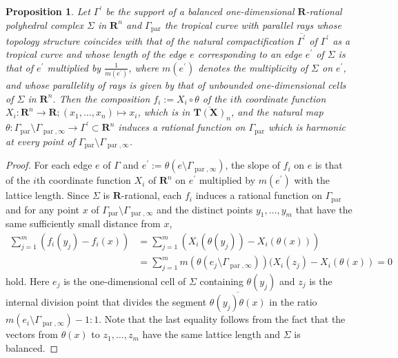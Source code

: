 \documentclass[a4paper,12pt]{amsart}
\newtheorem{prop}[dfn]{Proposition}
\def\Gamma{\varGamma}
\begin{document}
\begin{prop}
    \label{prop4-8-5}
Let $\Gamma^{\prime}$ be the support of a balanced one-dimensional $\boldsymbol{R}$-rational polyhedral complex $\Sigma$ in $\boldsymbol{R}^n$ and $\Gamma_{\operatorname{par}}$ the tropical curve with parallel rays whose topology structure coincides with that of the natural compactification $\overline{\Gamma^{\prime}}$ of $\Gamma^{\prime}$ as a tropical curve and whose length of the edge $e$ corresponding to an edge $e^{\prime}$ of $\Sigma$ is that of $e^{\prime}$ multiplied by $\frac{1}{m(e^{\prime})}$, where $m(e^{\prime})$ denotes the multiplicity of $\Sigma$ on $e^{\prime}$, and whose parallelity of rays is given by that of unbounded one-dimensional cells of $\Sigma$ in $\boldsymbol{R}^n$.
Then the composition $f_i := X_i \circ \theta$ of the $i$th coordinate function $X_i : \boldsymbol{R}^n \to \boldsymbol{R}; (x_1, \ldots, x_n) \mapsto x_i$, which is in $\overline{\boldsymbol{T}(\boldsymbol{X})}_n$, and the natural map $\theta : \Gamma_{\operatorname{par}} \setminus \Gamma_{\operatorname{par}, \infty} \to \Gamma^{\prime} \subset \boldsymbol{R}^n$ induces a rational function on $\Gamma_{\operatorname{par}}$ which is harmonic at every point of $\Gamma_{\operatorname{par}} \setminus \Gamma_{\operatorname{par}, \infty}$.
\end{prop}

\begin{proof}
For each edge $e$ of $\Gamma$ and $e^{\prime} := \theta(e \setminus \Gamma_{\operatorname{par}, \infty})$, the slope of $f_i$ on $e$ is that of the $i$th coordinate function $X_i$ of $\boldsymbol{R}^n$ on $e^{\prime}$ multiplied by $m(e^{\prime})$ with the lattice length.
Since $\Sigma$ is $\boldsymbol{R}$-rational, each $f_i$ induces a rational function on $\Gamma_{\operatorname{par}}$ and for any point $x$ of $\Gamma_{\operatorname{par}} \setminus \Gamma_{\operatorname{par}, \infty}$ and the distinct points $y_1, \ldots, y_m$ that have the same sufficiently small distance from $x$,
\begin{align*}
\sum_{j = 1}^m (f_i(y_j) - f_i(x)) &= \sum_{j = 1}^m (X_i(\theta(y_j)) - X_i(\theta(x)))\\
&= \sum_{j = 1}^m m(\theta(e_j \setminus \Gamma_{\operatorname{par}, \infty})) (X_i(z_j) - X_i(\theta(x)) = 0
\end{align*}
hold.
Here $e_j$ is the one-dimensional cell of $\Sigma$ containing $\theta(y_j)$ and $z_j$ is the internal division point that divides the segment $\overline{\theta(y_j) \theta(x)}$ in the ratio $m(e_i \setminus \Gamma_{\operatorname{par}, \infty}) - 1 : 1$.
Note that the last equality follows from the fact that the vectors from $\theta(x)$ to $z_1, \ldots, z_m$ have the same lattice length and $\Sigma$ is balanced.
\end{proof}
\end{document}
